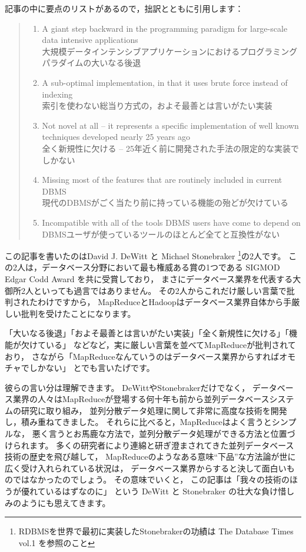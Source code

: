 記事の中に要点のリストがあるので，拙訳とともに引用します：

\begin{quote}
\begin{enumerate}
 \item A giant step backward in the programming paradigm for large-scale data intensive applications \\
	   大規模データインテンシブアプリケーションにおけるプログラミングパラダイムの大いなる後退
 \item A sub-optimal implementation, in that it uses brute force instead of indexing \\
	   索引を使わない総当り方式の，およそ最善とは言いがたい実装
 \item Not novel at all -- it represents a specific implementation of well known techniques developed nearly 25 years ago \\
	   全く新規性に欠ける -- 25年近く前に開発された手法の限定的な実装でしかない
 \item Missing most of the features that are routinely included in current DBMS \\
	   現代のDBMSがごく当たり前に持っている機能の殆どが欠けている
 \item Incompatible with all of the tools DBMS users have come to depend on \\
	   DBMSユーザが使っているツールのほとんど全てと互換性がない
\end{enumerate}
\end{quote}

この記事を書いたのはDavid J. DeWitt と Michael Stonebraker \footnote{RDBMSを世界で最初に実装したStonebrakerの功績は The Database Times vol.1 を参照のこと}の2人です。
この2人は，データベース分野において最も権威ある賞の1つである SIGMOD Edgar Codd Award を共に受賞しており，
まさにデータベース業界を代表する大御所2人といっても過言ではありません。
その2人からこれだけ厳しい言葉で批判されたわけですから，
MapReduceとHadoopはデータベース業界自体から手厳しい批判を受けたことになります。

「大いなる後退」「およそ最善とは言いがたい実装」「全く新規性に欠ける」「機能が欠けている」
などなど，実に厳しい言葉を並べてMapReduceが批判されており，
さながら「MapReduceなんていうのはデータベース業界からすればオモチャでしかない」
とでも言いたげです。

彼らの言い分は理解できます。
DeWittやStonebrakerだけでなく，
データベース業界の人々はMapReduceが登場する何十年も前から並列データベースシステムの研究に取り組み，
並列分散データ処理に関して非常に高度な技術を開発し，積み重ねてきました。
それらに比べると，MapReduceはよく言うとシンプルな，
悪く言うとお馬鹿な方法で，並列分散データ処理ができる方法と位置づけられます。
多くの研究者により連綿と研ぎ澄まされてきた並列データベース技術の歴史を飛び越して，
MapReduceのようなある意味``下品''な方法論が世に広く受け入れられている状況は，
データベース業界からすると決して面白いものではなかったのでしょう。
その意味でいくと，
この記事は「我々の技術のほうが優れているはずなのに」
という DeWitt と Stonebraker の壮大な負け惜しみのようにも思えてきます。

